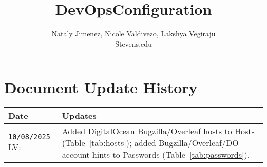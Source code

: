 %


\begin{titlepage}
        \title{DevOpsConfiguration}
        \author{Nataly Jimenez, Nicole Valdivezo, Lakshya Vegiraju \\ Stevens.edu }
        \conferraldate{}{\today} \maketitle
\end{titlepage}

\makecopyright

\begin{abstract}
\end{abstract}


% 


\contentspage

\tablelistpage

\figurelistpage

\section*{Document Update History}

\begin{longtable}{p{3cm}p{12cm}}
\textbf{Date} & \textbf{Updates} \\
\hline
\texttt{10/08/2025} LV: &
Added DigitalOcean Bugzilla/Overleaf hosts to Hosts (Table~\ref{tab:hosts});
added Bugzilla/Overleaf/DO account hints to Passwords (Table~\ref{tab:passwords}). \\
\hline
\end{longtable}
